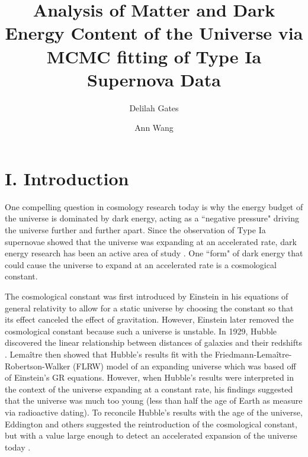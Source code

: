 \documentclass[aps,prl,reprint]{revtex4-1}
\begin{document}

\title{	Analysis of Matter and Dark Energy Content of the Universe via MCMC fitting of Type Ia Supernova Data}
\author{Delilah Gates}
\author{Ann Wang}
\begin{abstract}
\end{abstract}
\maketitle
\section{I. Introduction}
One compelling question in cosmology research today is why the energy budget of the universe is dominated by dark energy, acting as a ``negative pressure" driving the universe further and further apart. Since the observation of Type Ia supernovae showed that the universe was expanding at an accelerated rate, dark energy research has been an active area of study \cite{riess_sn}. One ``form" of dark energy that could cause the universe to expand at an accelerated rate is a cosmological constant.

The cosmological constant was first introduced by Einstein in his equations of general relativity to allow for a static universe by choosing the constant so that its effect canceled the effect of gravitation. However, Einstein later removed the cosmological constant because such a universe is unstable. In 1929, Hubble discovered the linear relationship between distances of galaxies and their redshifts \cite{Straumann:2002he}. Lemaître then showed that Hubble's results fit with the Friedmann-Lemaître-Robertson-Walker (FLRW) model of an expanding universe which was based off of Einstein's GR equations. However, when Hubble's results were interpreted in the context of the universe expanding at a constant rate, his findings suggested that the universe was much too young (less than half the age of Earth as measure via radioactive dating). To reconcile Hubble's results with the age of the universe, Eddington and others suggested the reintroduction of the cosmological constant, but with a value large enough to detect an accelerated expansion of the universe today \cite{Straumann:2002he}. 
\end{document}
